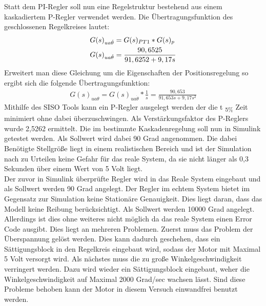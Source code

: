 \documentclass[10pt]{scrartcl}
\begin{document}
Statt dem PI-Regler soll nun eine Regelstruktur bestehend aus einem kaskadiertem P-Regler verwendet werden. Die Übertragungsfunktion des geschlossenen Regelkreises lautet:
\begin{align}
G(s)_{ua\dot{\theta}}&=G(s)_{PT1}*G(s)_{p} \notag \\
   G(s)_{ua\dot{\theta}}&=\frac{90,6525}{91,6252+9,17s}
\end{align} 
Erweitert man diese Gleichung um die Eigenschaften der Positionsregelung so ergibt sich die folgende Übertragungsfunktion:
\begin{align}
G(s)_{ ua\theta}=G(s)_{ua\dot{\theta}}*\frac{1}{s} = \frac{90,653}{91,653s+9,17s^2}
\end{align}
Mithilfe des SISO Tools kann ein P-Regler ausgelegt werden der die t \textsubscript{5\%} Zeit minimiert ohne dabei überzuschwingen. 
Als Verstärkungsfaktor des P-Reglers wurde 2,5262 ermittelt.
	Die im bestimmte Kaskadenregelung soll nun in Simulink getestet werden. Als Sollwert wird dabei 90 Grad angenommen. Die dabei Benötigte Stellgröße liegt in einem realistischen Bereich und ist der Simulation nach zu Urteilen keine Gefahr für das reale System, da sie nicht länger als 0,3 Sekunden über einem Wert von 5 Volt liegt.\\
	Der zuvor in Simulink überprüfte Regler wird in das Reale System eingebaut und als Sollwert werden 90 Grad angelegt. Der Regler im echtem System bietet im Gegensatz zur Simulation keine Stationäre Genauigkeit. Dies liegt daran, dass das Modell keine Reibung berücksichtigt.
	Als Sollwert werden 10000 Grad angelegt.
 Allerdings ist dies ohne weiteres nicht möglich da das reale System einen Error Code ausgibt. 
Dies liegt an mehreren Problemen.
	Zuerst muss das Problem der Überspannung gelöst werden. Dies kann dadurch geschehen, dass ein Sättigungsblock in den Regelkreis eingebaut wird, sodass der Motor mit Maximal 5 Volt versorgt wird. Als nächstes muss die zu große Winkelgeschwindigkeit verringert werden. Dazu wird wieder ein Sättigungsblock eingebaut, weher die Winkelgeschwindigkeit auf Maximal 2000 Grad/sec wachsen lässt. Sind diese Probleme behoben kann der Motor in diesem Versuch einwandfrei benutzt werden. 
\newpage
\end{document}
